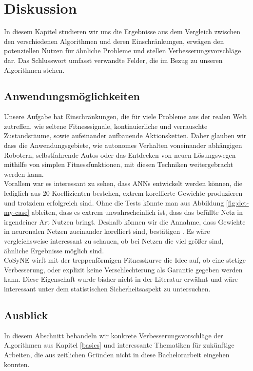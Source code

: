 \chapter{Diskussion}
    In diesem Kapitel studieren wir uns die Ergebnisse aus dem Vergleich zwischen den verschiedenen Algorithmen und deren Einschränkungen, erwägen den potenziellen Nutzen für ähnliche Probleme und stellen Verbesserungsvorschläge dar. Das Schlusswort umfasst verwandte Felder, die im Bezug zu unseren Algorithmen stehen.
    \section{Anwendungsmöglichkeiten}
        Unsere Aufgabe hat Einschränkungen, die für viele Probleme aus der realen Welt zutreffen, wie seltene Fitnesssignale, kontinuierliche und verrauschte Zustandsräume, sowie aufeinander aufbauende Aktionsketten. Daher glauben wir dass die Anwendungsgebiete, wie autonomes Verhalten voneinander abhängigen Robotern, selbstfahrende Autos oder das Entdecken von neuen Lösungswegen mithilfe von simplen Fitnessfunktionen, mit diesen Techniken weitergebracht werden kann. \\

        \noindent
        Vorallem war es interessant zu sehen, dass ANNs entwickelt werden können, die lediglich aus 20 Koeffizienten bestehen, extrem korellierte Gewichte produzieren und trotzdem erfolgreich sind. Ohne die Tests könnte man aus Abbildung \ref{fig:dct-my-case} ableiten, dass es extrem unwahrscheinlich ist, dass das befüllte Netz in irgendeiner Art Nutzen bringt. Deshalb können wir die Annahme, dass Gewichte in neuronalen Netzen zueinander korelliert sind, bestätigen \cite{cosyne1}. Es wäre vergleichsweise interessant zu schauen, ob bei Netzen die viel größer sind, ähnliche Ergebnisse möglich sind. \\

        \noindent
        CoSyNE wirft mit der treppenförmigen Fitnesskurve die Idee auf, ob eine stetige Verbesserung, oder explizit keine Verschlechterung als Garantie gegeben werden kann. Diese Eigenschaft wurde bisher nicht in der Literatur \cite{cosyne1}\cite{cosyne2}\cite{cosyne3} erwähnt und wäre interessant unter dem statistischen Sicherheitsaspekt zu untersuchen.

\newpage

    \section{Ausblick} \label{ausblick}
        In diesem Abschnitt behandeln wir konkrete Verbesserungsvorschläge der Algorithmen aus Kapitel \ref{basics} und interessante Thematiken für zukünftige Arbeiten, die aus zeitlichen Gründen nicht in diese Bachelorarbeit eingehen konnten.

